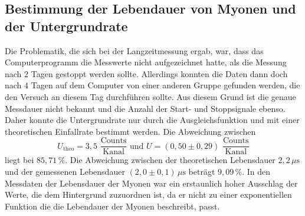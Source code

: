 \subsection{Bestimmung der Lebendauer von Myonen und der Untergrundrate}
Die Problematik, die sich bei der Langzeitmessung ergab, war, dass das Computerprogramm die Messwerte nicht aufgezeichnet hatte, als
die Messung nach $2$ Tagen gestoppt werden sollte. Allerdings konnten die Daten dann doch nach $4$ Tagen auf dem Computer von einer 
anderen Gruppe gefunden werden, die den Versuch an diesem Tag durchführen sollte. Aus diesem Grund ist die genaue Messdauer nicht
bekannt und die Anzahl der Start- und Stoppsignale ebenso. Daher konnte die Untergrundrate nur durch die Ausgleichsfunktion und 
mit einer theoretischen Einfallrate bestimmt werden. Die Abweichung zwischen 
$$U_{\text{theo}} = 3,5 \,\, \frac{\text{Counts}}{\text{Kanal}}\,\, \text{und} \,\, U = (0,50 \pm 0,29) \,\, \frac{\text{Counts}}{\text{Kanal}}$$
liegt bei $85,71 \, \%$. Die Abweichung zwischen der theoretischen Lebensdauer $2,2 \, \unit{\mu\second}$ und der gemessenen Lebensdauer 
$(2,0 \pm 0,1)\, \unit{\mu\second}$ beträgt $9,09 \, \%$. In den Messdaten der Lebensdauer der Myonen war ein erstaunlich hoher 
Ausschlag der Werte, die dem Hintergrund zuzuordnen ist, da er nicht zu einer exponentiellen Funktion die die Lebendauer der 
Myonen beschreibt, passt. 

